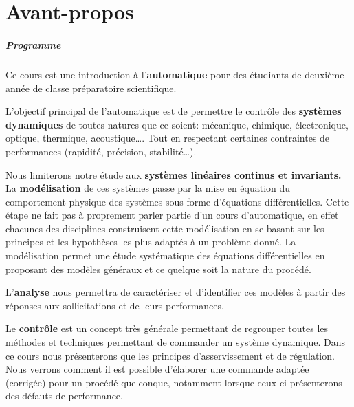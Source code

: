 \chapter*{Avant-propos}

\paragraph{Programme}

Ce cours est une introduction à l'\textbf{automatique}
pour des étudiants de deuxième année de classe préparatoire scientifique.

L'objectif principal de l'automatique est de permettre
le contrôle des \textbf{systèmes dynamiques}
de toutes natures que ce soient: mécanique, chimique, 
électronique, optique, thermique, acoustique\ldots.
Tout en respectant certaines contraintes de performances 
(rapidité, précision, stabilité\ldots).

Nous limiterons notre étude aux \textbf{systèmes linéaires continus et invariants.}
La \textbf{modélisation} de ces systèmes passe par 
la mise en équation du comportement physique des
systèmes sous forme d'équations différentielles.
Cette étape ne fait pas à proprement parler partie d'un cours d'automatique,
en effet chacunes des disciplines construisent cette modélisation 
en se basant sur les principes et les hypothèses les plus adaptés 
à un problème donné.
La modélisation permet une étude systématique des équations
différentielles en proposant des modèles généraux 
et ce quelque soit la nature du procédé.

L'\textbf{analyse} nous permettra de caractériser et d'identifier 
ces modèles à partir des réponses aux sollicitations et de leurs performances.

Le \textbf{contrôle} est un concept très générale permettant de regrouper
toutes les méthodes et techniques permettant de commander un système dynamique.
Dans ce cours nous présenterons que les principes d'asservissement et de régulation.
Nous verrons comment il est possible d'élaborer une commande adaptée (corrigée) 
pour un procédé quelconque, notamment lorsque ceux-ci présenterons des défauts de performance.


